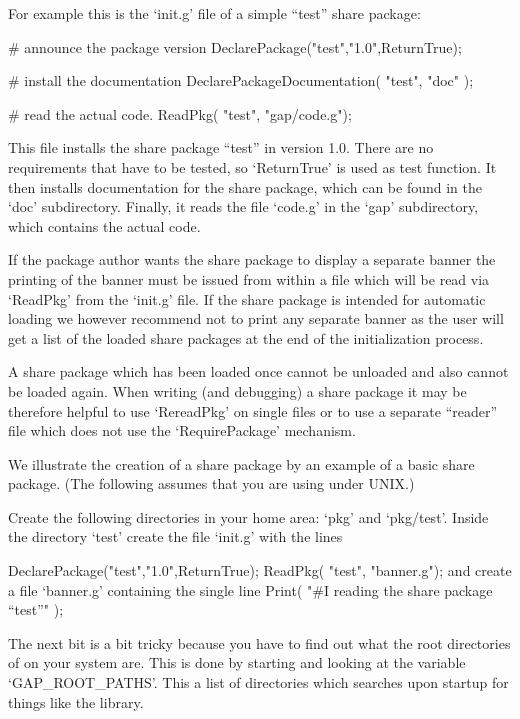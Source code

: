 For example this is the `init.g' file of a simple ``test'' share package:

\begintt
# announce the package version
DeclarePackage("test","1.0",ReturnTrue);

# install the documentation
DeclarePackageDocumentation( "test", "doc" );

# read the actual code.
ReadPkg( "test", "gap/code.g");
\endtt

This file installs the share package ``test'' in version 1.0. There
are no requirements that have to be tested, so `ReturnTrue' is used as
test function. It then installs documentation for the share package,
which can be found in the `doc' subdirectory. Finally, it reads the
file `code.g' in the `gap' subdirectory, which contains the actual
code.

If the package author wants the share package to display a separate
banner the printing of the banner must be issued from within a file
which will be read via `ReadPkg' from the `init.g' file. If the share
package is intended for automatic loading we however recommend not to print
any separate banner as the user will get a list of the loaded share packages
at the end of the initialization process.

A share package which has been loaded once
cannot be unloaded and also cannot be loaded again.
When  writing (and debugging) a share package it may be therefore
helpful to use  `RereadPkg' on single  files or to use a separate
``reader'' file which does not use the `RequirePackage' mechanism.


We illustrate the creation of a share package by an example of a basic
share package. (The following assumes that you are using {\GAP} under UNIX.)

Create the following  directories in your home area:  `pkg' and
`pkg/test'. Inside the directory `test' create the file `init.g' with
the lines

\begintt
DeclarePackage("test","1.0",ReturnTrue);
ReadPkg( "test", "banner.g");
\endtt
and create a file `banner.g' containing the single line
\begintt
Print( "#I reading the share package ``test''\n" );
\endtt

The next bit is a bit tricky because you have to find out what the
root directories of {\GAP} on your system are.  This is done by
starting {\GAP} and looking at the variable `GAP_ROOT_PATHS'. This a
list of directories which {\GAP} searches upon startup for things like
the {\GAP} library.

